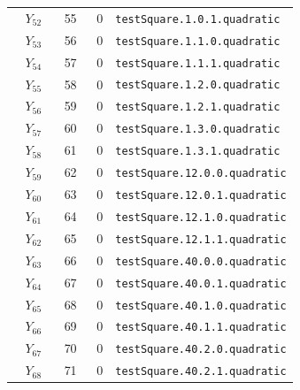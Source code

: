 {\begin{longtable}{@{}r r r p{0.64\linewidth}@{}}
\(Y_{52}\) & 55 & 0 & \texttt{testSquare.\allowbreak{}1.\allowbreak{}0.\allowbreak{}1.\allowbreak{}quadratic} \\
\(Y_{53}\) & 56 & 0 & \texttt{testSquare.\allowbreak{}1.\allowbreak{}1.\allowbreak{}0.\allowbreak{}quadratic} \\
\(Y_{54}\) & 57 & 0 & \texttt{testSquare.\allowbreak{}1.\allowbreak{}1.\allowbreak{}1.\allowbreak{}quadratic} \\
\(Y_{55}\) & 58 & 0 & \texttt{testSquare.\allowbreak{}1.\allowbreak{}2.\allowbreak{}0.\allowbreak{}quadratic} \\
\(Y_{56}\) & 59 & 0 & \texttt{testSquare.\allowbreak{}1.\allowbreak{}2.\allowbreak{}1.\allowbreak{}quadratic} \\
\(Y_{57}\) & 60 & 0 & \texttt{testSquare.\allowbreak{}1.\allowbreak{}3.\allowbreak{}0.\allowbreak{}quadratic} \\
\(Y_{58}\) & 61 & 0 & \texttt{testSquare.\allowbreak{}1.\allowbreak{}3.\allowbreak{}1.\allowbreak{}quadratic} \\
\(Y_{59}\) & 62 & 0 & \texttt{testSquare.\allowbreak{}12.\allowbreak{}0.\allowbreak{}0.\allowbreak{}quadratic} \\
\(Y_{60}\) & 63 & 0 & \texttt{testSquare.\allowbreak{}12.\allowbreak{}0.\allowbreak{}1.\allowbreak{}quadratic} \\
\(Y_{61}\) & 64 & 0 & \texttt{testSquare.\allowbreak{}12.\allowbreak{}1.\allowbreak{}0.\allowbreak{}quadratic} \\
\(Y_{62}\) & 65 & 0 & \texttt{testSquare.\allowbreak{}12.\allowbreak{}1.\allowbreak{}1.\allowbreak{}quadratic} \\
\(Y_{63}\) & 66 & 0 & \texttt{testSquare.\allowbreak{}40.\allowbreak{}0.\allowbreak{}0.\allowbreak{}quadratic} \\
\(Y_{64}\) & 67 & 0 & \texttt{testSquare.\allowbreak{}40.\allowbreak{}0.\allowbreak{}1.\allowbreak{}quadratic} \\
\(Y_{65}\) & 68 & 0 & \texttt{testSquare.\allowbreak{}40.\allowbreak{}1.\allowbreak{}0.\allowbreak{}quadratic} \\
\(Y_{66}\) & 69 & 0 & \texttt{testSquare.\allowbreak{}40.\allowbreak{}1.\allowbreak{}1.\allowbreak{}quadratic} \\
\(Y_{67}\) & 70 & 0 & \texttt{testSquare.\allowbreak{}40.\allowbreak{}2.\allowbreak{}0.\allowbreak{}quadratic} \\
\(Y_{68}\) & 71 & 0 & \texttt{testSquare.\allowbreak{}40.\allowbreak{}2.\allowbreak{}1.\allowbreak{}quadratic} \\

\end{longtable}}
